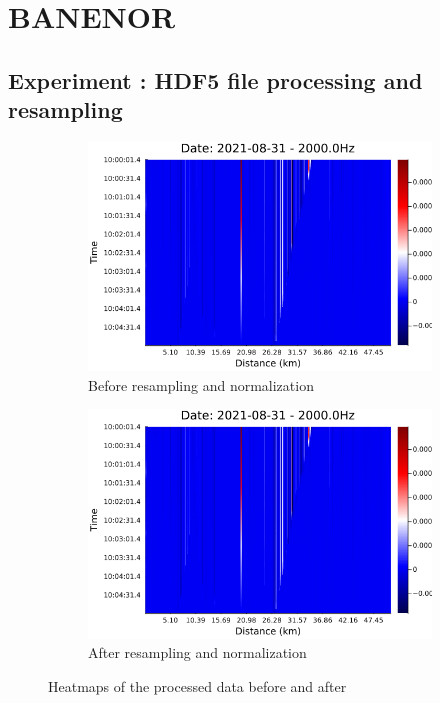 \section{BANENOR}
\label{res:Judas}


\subsection{Experiment : HDF5 file processing and resampling}

\begin{figure}[!h]
    \centering
    \begin{subfigure}{0.45\linewidth}
        \centering
        \includegraphics[width=\linewidth]{figures/heatmap_das_test.png}
        \caption{Before resampling and normalization}
        \label{fig:dasoutput1}
    \end{subfigure}
    \hfill
    \begin{subfigure}{0.45\linewidth}
        \centering
        \includegraphics[width=\linewidth]{figures/heatmap_das_test.png}
        \caption{After resampling and normalization}
        \label{fig:dasoutput2}
    \end{subfigure}
    \caption{Heatmaps of the processed data before and after }
    \label{fig:dasoutput}
\end{figure}


